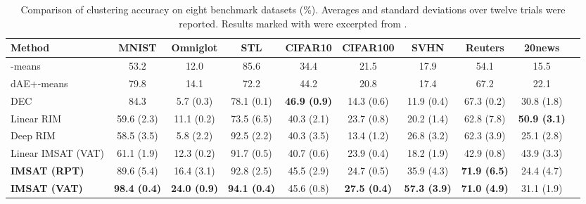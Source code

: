 \documentclass{article}
\theoremstyle{plain}
\begin{document}
\begin{table*}[t] 
\footnotesize
\begin{center}
\caption{Comparison of clustering accuracy on eight benchmark datasets (\%). Averages and standard deviations over twelve trials were reported. Results marked with  were excerpted from \citet{xie2016unsupervised}.}
\begin{tabular}{|l||c|c|c|c|c|c|c|c|c|}\hline
Method & MNIST & Omniglot& STL & CIFAR10 & CIFAR100 & SVHN & Reuters & 20news  \\ \hline \hline
-means & 53.2  & 12.0  & 85.6 & 34.4  & 21.5  & 17.9  & 54.1  & 15.5   \\ \hline
dAE+-means & 79.8   & 14.1  & 72.2 & 44.2  & 20.8  & 17.4  & 67.2  & 22.1    \\ \hline
DEC  &84.3  & 5.7 (0.3)  & 78.1 (0.1) &  {\bf 46.9 (0.9)}  & 14.3 (0.6)  & 11.9 (0.4)  &67.3 (0.2)  & 30.8 (1.8)   \\  \hline
Linear RIM  & 59.6 (2.3)  & 11.1 (0.2) &  73.5 (6.5)  &  40.3 (2.1)  &  23.7 (0.8)  & 20.2 (1.4)   &  62.8 (7.8)  & {\bf 50.9 (3.1)}   \\ \hline
Deep RIM  & 58.5 (3.5)   & 5.8 (2.2)  & 92.5 (2.2)  & 40.3 (3.5)  &  13.4 (1.2) & 26.8 (3.2)  & 62.3 (3.9)  & 25.1 (2.8)    \\ \hline
Linear IMSAT (VAT) & 61.1 (1.9)   & 12.3 (0.2)  & 91.7 (0.5)  & 40.7 (0.6)  &  23.9 (0.4) & 18.2 (1.9)  & 42.9 (0.8)  & 43.9 (3.3)    \\ \hline
{\bf IMSAT (RPT)} & 89.6 (5.4)   & 16.4 (3.1)  & 92.8 (2.5)  & 45.5 (2.9)  &  24.7 (0.5) & 35.9 (4.3)  & {\bf 71.9 (6.5)}  & 24.4 (4.7)    \\ \hline
{\bf IMSAT (VAT)} & {\bf 98.4 (0.4)} &  {\bf 24.0 (0.9)}  & {\bf 94.1 (0.4)}  & 45.6 (0.8) & {\bf 27.5 (0.4)}  & {\bf 57.3 (3.9)}  & {\bf 71.0 (4.9)}  & 31.1 (1.9)   \\ \hline
\end{tabular}
\label{table:clustering}
\end{center}
\end{table*}
\end{document}
